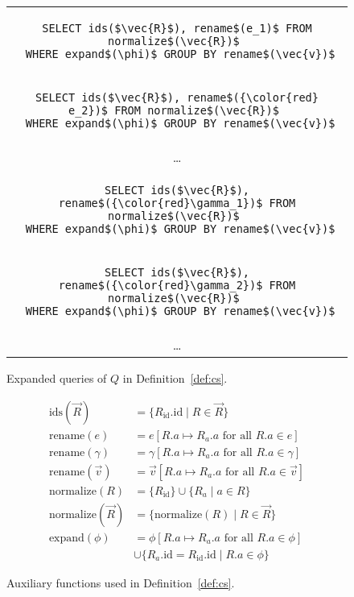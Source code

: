 \documentclass[sigconf,nonacm]{acmart}
\begin{document}
\begin{figure}
\centering
\begin{tabular}{c}
\begin{lstlisting}
SELECT ids($\vec{R}$), rename$(e_1)$ FROM normalize$(\vec{R})$ 
 WHERE expand$(\phi)$ GROUP BY rename$(\vec{v})$
\end{lstlisting}\\
\begin{lstlisting}[basicstyle=\color{black!40}\ttfamily\small]
SELECT ids($\vec{R}$), rename$({\color{red} e_2})$ FROM normalize$(\vec{R})$ 
 WHERE expand$(\phi)$ GROUP BY rename$(\vec{v})$
\end{lstlisting}\\
\dots\\
\begin{lstlisting}[basicstyle=\color{black!40}\ttfamily\small]
SELECT ids($\vec{R}$), rename$({\color{red}\gamma_1})$ FROM normalize$(\vec{R})$ 
 WHERE expand$(\phi)$ GROUP BY rename$(\vec{v})$
\end{lstlisting}\\
\begin{lstlisting}[basicstyle=\color{black!40}\ttfamily\small]
SELECT ids($\vec{R}$), rename$({\color{red}\gamma_2})$ FROM normalize$(\vec{R})$ 
 WHERE expand$(\phi)$ GROUP BY rename$(\vec{v})$
\end{lstlisting}\\
\dots
\end{tabular}
\caption{Expanded queries of $Q$ in Definition~\ref{def:cs}.}
\label{fig:expanded}
\end{figure}

\begin{figure}
\begin{align*}
\text{ids}(\vec{R}) &= \{ R_\text{id}.\text{id} \mid R \in \vec{R} \} \\
\text{rename}(e) &= e[R.a \mapsto R_a.a \text{ for all } R.a \in e] \\
\text{rename}(\gamma) &= \gamma[R.a \mapsto R_a.a \text{ for all } R.a \in \gamma] \\
\text{rename}(\vec{v}) &= \vec{v}[R.a \mapsto R_a.a \text{ for all } R.a \in \vec{v}] \\
\text{normalize}(R) &= \{ R_\text{id} \} \cup \{ R_a \mid a \in R \} \\
\text{normalize}(\vec{R}) &= \{ \text{normalize}(R) \mid R \in \vec{R} \} \\
\text{expand}(\phi) &= \phi[R.a \mapsto R_a.a \text{ for all } R.a \in \phi] \\
&\cup \{ R_a.\text{id} = R_\text{id}.\text{id} \mid R.a \in \phi \}
\end{align*}
\caption{Auxiliary functions used in Definition~\ref{def:cs}.}
\label{fig:aux}
\end{figure}
\end{document}
